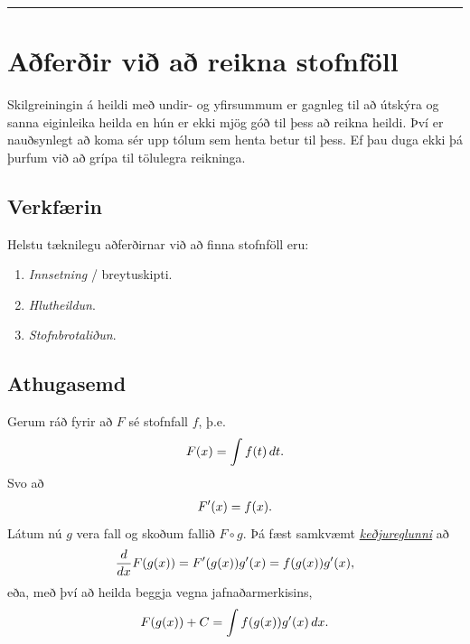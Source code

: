 \documentclass[b5paper,10pt,icelandic]{sphinxmanual}
\begin{document}
\bigskip\hrule{}\bigskip



\section{Aðferðir við að reikna stofnföll}
\label{kafli06:aferir-vi-a-reikna-stofnfoll}
Skilgreiningin á heildi með undir- og yfirsummum er gagnleg til að útskýra
og sanna eiginleika heilda en hún er ekki mjög góð til þess að reikna
heildi. Því er nauðsynlegt að koma sér upp tólum sem henta betur til þess.
Ef þau duga ekki þá þurfum við að grípa til tölulegra reikninga.


\subsection{Verkfærin}
\label{kafli06:verkfaerin}
Helstu tæknilegu aðferðirnar við að finna stofnföll eru:
\begin{enumerate}
\item {} 
\textit{Innsetning} / breytuskipti.

\item {} 
\textit{Hlutheildun}.

\item {} 
\textit{Stofnbrotaliðun}.

\end{enumerate}


\subsection{Athugasemd}
\label{kafli06:athugasemd}
Gerum ráð fyrir að \(F\) sé stofnfall \(f\), þ.e.
\begin{gather}
\begin{split}F(x)=\int f(t)\,dt.\end{split}\notag
\end{gather}
Svo að
\begin{gather}
\begin{split}F'(x)=f(x).\end{split}\notag
\end{gather}
Látum nú \(g\) vera fall og skoðum fallið \(F\circ g\). Þá fæst
samkvæmt {\hyperref[kafli03:kedjuregla]{\emph{keðjureglunni}}} að
\begin{gather}
\begin{split}\frac{d}{dx}F(g(x))=F'(g(x))g'(x) = f(g(x))g'(x),\end{split}\notag
\end{gather}
eða, með því að heilda beggja vegna jafnaðarmerkisins,
\begin{gather}
\begin{split}F(g(x))+C = \int f(g(x))g'(x)\,dx.\end{split}\notag
\end{gather}
\end{document}
